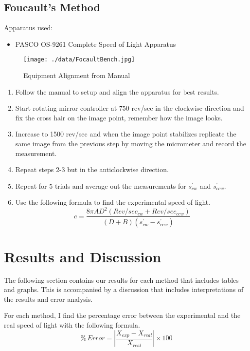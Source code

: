 \documentclass[12pt]{article}
\begin{document}
\clearpage
	
	\subsection{Foucault's Method}
	Apparatus used:
	\begin{itemize}
		\item PASCO OS-9261 Complete Speed of
		Light Apparatus
	\end{itemize}
	\begin{figure}[!h]
		\centering
		\caption{Equipment Alignment from Manual}
		\label{FoucaultBench}
		\texttt{[image: ./data/FocaultBench.jpg]}
	\end{figure}
	\begin{enumerate}
		\item Follow the manual to setup and align the apparatus for best results.
		\item Start rotating mirror controller at 750 rev/sec in the clockwise direction and fix the cross hair on the image point, remember how the image looks.
		\item Increase to 1500 rev/sec and when the image point stabilizes replicate the same image from the previous step by moving the micrometer and record the measurement.
		\item Repeat steps 2-3 but in the anticlockwise direction.
		\item Repeat for 5 trials and average out the measurements for $s^\prime_{cw}$ and $s^\prime_{ccw}$.
		\item Use the following formula to find the experimental speed of light.
		\[
		c = \frac{8 \pi A D^2 \left( Rev/sec_{cw} + Rev/sec_{ccw} \right)}{\left( D + B \right)\left( s^\prime_{cw} - s^\prime_{ccw} \right)}
		\]
	\end{enumerate}

\clearpage

	\section{Results and Discussion}

	The following section contains our results for each method that includes tables and graphs. This is accompanied by a discussion that includes interpretations of the results and error analysis.
	
	For each method, I find the percentage error between the experimental and the real speed of light with the following formula.
	\[
	\% \, Error = \left| \frac{X_{exp}-X_{real}}{X_{real}} \right| \times 100
	\]
	
\end{document}
